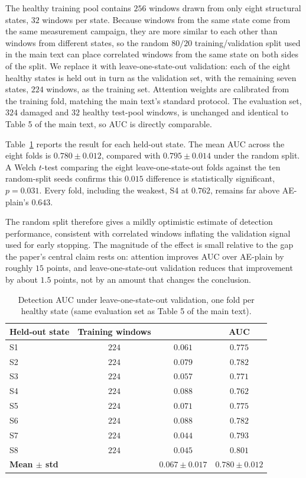 \documentclass[11pt,a4paper]{article}
\begin{document}
The healthy training pool contains $256$ windows drawn from only eight
structural states, $32$ windows per state. Because windows from the same
state come from the same measurement campaign, they are more similar to each
other than windows from different states, so the random $80/20$
training/validation split used in the main text can place correlated
windows from the same state on both sides of the split. We replace it with
leave-one-state-out validation: each of the eight healthy states is held out
in turn as the validation set, with the remaining seven states, $224$
windows, as the training set. Attention weights are calibrated from the
training fold, matching the main text's standard protocol. The evaluation
set, $324$ damaged and $32$ healthy test-pool windows, is unchanged and
identical to Table 5 of the main text, so AUC is directly comparable.

Table~\ref{tab:loso} reports the result for each held-out state. The mean
AUC across the eight folds is $0.780 \pm 0.012$, compared with
$0.795 \pm 0.014$ under the random split. A Welch $t$-test comparing the
eight leave-one-state-out folds against the ten random-split seeds confirms
this $0.015$ difference is statistically significant, $p=0.031$. Every fold,
including the weakest, S4 at $0.762$, remains far above AE-plain's $0.643$.

The random split therefore gives a mildly optimistic estimate of detection
performance, consistent with correlated windows inflating the validation
signal used for early stopping. The magnitude of the effect is small
relative to the gap the paper's central claim rests on: attention improves
AUC over AE-plain by roughly $15$ points, and leave-one-state-out validation
reduces that improvement by about $1.5$ points, not by an amount that
changes the conclusion.

\begin{table}[htbp]
\centering
\caption{Detection AUC under leave-one-state-out validation, one fold per
healthy state (same evaluation set as Table 5 of the main text).}
\label{tab:loso}
\small
\begin{tabular}{@{}lccc@{}}
\toprule
\textbf{Held-out state} & \textbf{Training windows} & \boldmath{$\beta$} & \textbf{AUC} \\
\midrule
S1 & $224$ & $0.061$ & $0.775$ \\
S2 & $224$ & $0.079$ & $0.782$ \\
S3 & $224$ & $0.057$ & $0.771$ \\
S4 & $224$ & $0.088$ & $0.762$ \\
S5 & $224$ & $0.071$ & $0.775$ \\
S6 & $224$ & $0.088$ & $0.782$ \\
S7 & $224$ & $0.044$ & $0.793$ \\
S8 & $224$ & $0.045$ & $0.801$ \\
\midrule
\textbf{Mean $\pm$ std} & & $0.067 \pm 0.017$ & $0.780 \pm 0.012$ \\
\bottomrule
\end{tabular}
\end{table}
\end{document}
